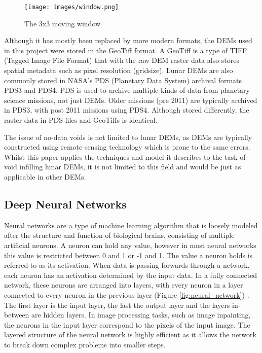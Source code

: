 \documentclass[twocolumn]{article}
\begin{document}
\begin{figure}[htbp]
\centering
\texttt{[image: images/window.png]}
\caption{\label{fig:window}The 3x3 moving window\autocite{qiuVoidFillingDigital2019}}
\end{figure}

Although it has mostly been replaced by more modern formats, the DEMs used in this project were stored in the GeoTiff format.
A GeoTiff is a type of TIFF (Tagged Image File Format) that with the raw DEM raster data also stores spatial metadata such as pixel resolution (gridsize).
Lunar DEMs are also commonly stored in NASA's PDS (Planetary Data System) archival formats PDS3 and PDS4.
PDS is used to archive multiple kinds of data from planetary science missions, not just DEMs.
Older missions (pre 2011) are typically archived in PDS3, with post 2011 missions using PDS4.
Although stored differently, the raster data in PDS files and GeoTiffs is identical.

The issue of no-data voids is not limited to lunar DEMs, as DEMs are typically constructed using remote sensing technology which is prone to the same errors.
Whilst this paper applies the techniques and model it describes to the task of void infilling lunar DEMs, it is not limited to this field and would be just as applicable in other DEMs.

\subsection{Deep Neural Networks}
\label{sec:orgb00991d}

Neural networks are a type of machine learning algorithm that is loosely modeled after the structure and function of biological brains, consisting of multiple artificial neurons\autocite{grossiIntroductionArtificialNeural2008}.
A neuron can hold any value, however in most neural networks this value is restricted between 0 and 1 or -1 and 1.
The value a neuron holds is referred to as its activation.
When data is passing forwards through a network, each neuron has an activation determined by the input data.
In a fully connected network, these neurons are arranged into layers, with every neuron in a layer connected to every neuron in the previous layer (Figure \ref{fig:neural_network}) .
The first layer is the input layer, the last the output layer and the layers in-between are hidden layers.
In image processing tasks, such as image inpainting, the neurons in the input layer correspond to the pixels of the input image.
The layered structure of the neural network is highly efficient as it allows the network to break down complex problems into smaller steps.
\end{document}
